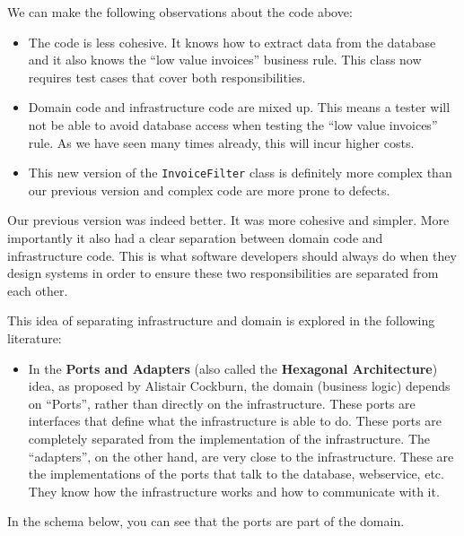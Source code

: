 We can make the following observations about the code above:

\begin{itemize}
\tightlist
\item
  The code is less cohesive. It knows how to extract data from the
  database and it also knows the ``low value invoices'' business rule.
  This class now requires test cases that cover both responsibilities.
\item
  Domain code and infrastructure code are mixed up. This means a tester
  will not be able to avoid database access when testing the ``low value
  invoices'' rule. As we have seen many times already, this will incur
  higher costs.
\item
  This new version of the \texttt{InvoiceFilter} class is definitely
  more complex than our previous version and complex code are more prone
  to defects.
\end{itemize}

Our previous version was indeed better. It was more cohesive and
simpler. More importantly it also had a clear separation between domain
code and infrastructure code. This is what software developers should
always do when they design systems in order to ensure these two
responsibilities are separated from each other.

This idea of separating infrastructure and domain is explored in the
following literature:

\begin{itemize}
\tightlist
\item
  In the \textbf{Ports and Adapters} (also called the \textbf{Hexagonal
  Architecture}) idea, as proposed by Alistair Cockburn, the domain
  (business logic) depends on ``Ports'', rather than directly on the
  infrastructure. These ports are interfaces that define what the
  infrastructure is able to do. These ports are completely separated
  from the implementation of the infrastructure. The ``adapters'', on
  the other hand, are very close to the infrastructure. These are the
  implementations of the ports that talk to the database, webservice,
  etc. They know how the infrastructure works and how to communicate
  with it.
\end{itemize}

In the schema below, you can see that the ports are part of the domain.

